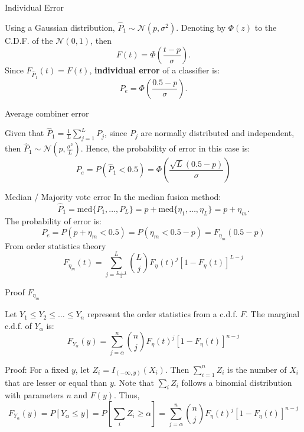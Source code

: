\documentclass[xcolor=table]{beamer}
\begin{document}
\begin{frame}{Individual Error}

Using a Gaussian distribution, \(\hat P_1 \sim \mathcal N(p,\sigma^2)\). Denoting by \(\Phi(z)\) to the C.D.F. of the \(\mathcal N(0,1)\), then
\[
F(t) = \Phi\left( \frac{t-p}{\sigma}\right).
\]
\pause
Since \(F_{\hat P_1}(t) = F(t)\), \textbf{individual error} of a classifier is:
\[
P_e = \Phi\left( \frac{0.5-p}{\sigma}\right).
\]
    
\end{frame}

\begin{frame}{Average combiner error}

Given that \(\hat P_1 = \frac{1}{L}  \sum_{j=1}^L P_j\), since \(P_j\) are normally distributed and independent, then \(\hat P_1 \sim \mathcal N \left(p, \frac{\sigma^2}{L}\right)\). Hence, the probability of error in this case is:
\[
P_e = P(\hat P_1 < 0.5) = \Phi \left( \frac{\sqrt{L} (0.5 - p)}{\sigma}\right)
\]
    
\end{frame}

\begin{frame}{Median / Majority vote error}
    In the median fusion method:
    \[
    \hat P_1 = \text{med} \{ P_1,\dots,P_L\} = p + \text{med}\{\eta_1,\dots,\eta_L\} = p + \eta_m. 
    \]
    \pause
    The probability of error is:
    \[
    P_e = P(p + \eta_m < 0.5) = P(\eta_m < 0.5 - p) = F_{\eta_m}(0.5 - p)
    \]
    \pause
    From order statistics theory \citep{mood1973introduction}
    \[
    F_{\eta_m}(t) = \sum_{j = \frac{L+1}{2}}^L \binom{L}{j} F_\eta(t)^j[1-F_\eta(t)]^{L-j}
    \]
\end{frame}

\begin{frame}{Proof \(F_{\eta_m}\)}
    \begin{theorem}
    Let \(Y_1\leq Y_2 \leq \dots \leq Y_n\) represent the order statistics from a c.d.f. \(F\). The marginal c.d.f. of \(Y_\alpha\) is:
    \[
    F_{Y_\alpha}(y) =  \sum_{j = \alpha}^n \binom{n}{j} F_\eta(t)^j[1-F_\eta(t)]^{n-j}
    \]
    \end{theorem}
    Proof: For a fixed \(y\), let \(Z_i = I_{(-\infty,y)}(X_i)\). Then \(\sum_{i=1}^n Z_i\) is the number of \(X_i\) that are lesser or equal than \(y\). Note that \(\sum_i Z_i\) follows a binomial distribution with parameters \(n\) and \(F(y)\). Thus,
    \[
    F_{Y_\alpha}(y) = P[Y_\alpha \leq y] = P\left[\sum_i Z_i \geq \alpha\right] = \sum_{j = \alpha}^n \binom{n}{j} F_\eta(t)^j[1-F_\eta(t)]^{n-j}
    \]
\end{frame}
\end{document}
